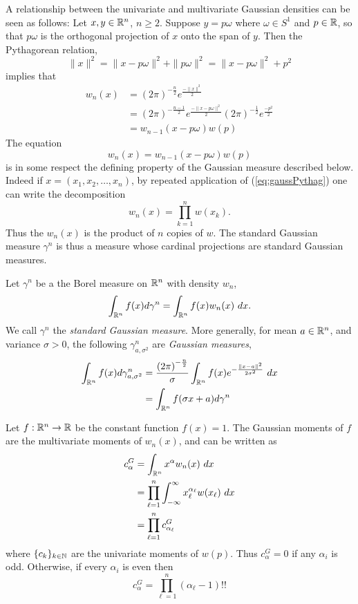 A relationship between the univariate and multivariate Gaussian densities can be seen as follows: Let $x, y \in \mathbb{R}^n$, $n \geq 2$. Suppose $y = p\omega$ where $\omega \in S^1$ and $p \in \mathbb{R}$, so that $p\omega$ is the orthogonal projection of $x$ onto the span of $y$. Then the Pythagorean relation,
\[
  \|x\|^2 = \|x - p\omega\|^2 + \|p\omega\|^2 = \|x - p\omega\|^2 + p^2
\]
implies that
\begin{align*}
  w_n(x) 
  &= {(2\pi)}^{-\frac n2} e^{\frac{-\|x\|^2}2} \\
  &= {(2\pi)}^{-\frac{n-1}2} e^{\frac{-\|x - p\omega\|^2}2} {(2\pi)}^{-\frac12} e^{\frac{-p^2}2} \\
  &= w_{n-1}(x - p\omega)w(p)
\end{align*}
The equation
\begin{equation}\label{eq:gaussPythag}
  w_n(x) = w_{n-1}(x - p\omega)w(p)
\end{equation}
is in some respect the defining property of the Gaussian measure described below. Indeed if $x = (x_1, x_2, \ldots, x_n)$, by repeated application of (\ref{eq:gaussPythag}) one can write the decomposition
\[
  w_n(x) = \prod_{k = 1}^n w(x_k).
\]
Thus the $w_n(x)$ is the product of $n$ copies of $w$. The standard Gaussian measure $\gamma^n$ is thus a measure whose cardinal projections are standard Gaussian measures.

\begin{definition}
Let $\gamma^n$ be a the Borel measure on $\mathbb{R}^n$ with density $w_n$,
\[
  \int_{\mathbb{R}^n} f(x) d\gamma^n = \int_{\mathbb{R}^n} f(x) w_n(x) ~dx.
\]
We call $\gamma^n$ the \textit{standard Gaussian measure}. 
More generally, for mean $a \in \mathbb{R}^n$, and variance $\sigma > 0$, the following $\gamma^{n}_{a, \sigma^2}$ are \textit{Gaussian measures},
\begin{align*}
  \int_{\mathbb{R}^n} f(x) d\gamma^n_{a,\sigma^2}
  &= \frac{{(2\pi)}^{-\frac n2}}{\sigma}  \int_{\mathbb{R}^n} f(x) e^{-\frac{\|x - a\|^2}{2\sigma^2}} ~dx \\
  &= \int_{\mathbb{R}^n} f(\sigma x + a) d\gamma^n
\end{align*}
\end{definition}

\begin{myexample}
  Let $f:\mathbb{R}^n \rightarrow \mathbb{R}$ be the constant function $f(x)=1$. The Gaussian moments of $f$ are the multivariate moments of $w_n(x)$, and can be written as
  \begin{align*}
    c^G_\alpha 
    &= \int_{\mathbb{R}^n} x^\alpha w_n(x) ~dx \\
    &= \prod_{\ell = 1}^n \int_{-\infty}^\infty x_\ell^{\alpha_\ell} w(x_\ell) ~dx \\
    &= \prod_{\ell = 1}^n c^G_{\alpha_\ell}
  \end{align*}
  where $\{c_k\}_{k \in \mathbb{N}}$ are the univariate moments of $w(p)$.
  Thus $c^G_\alpha = 0$ if any $\alpha_i$ is odd. Otherwise, if every $\alpha_i$ is even then
  \[
    c^G_\alpha = \prod_{\ell = 1}^n (\alpha_\ell - 1)!!
  \]
\end{myexample}

